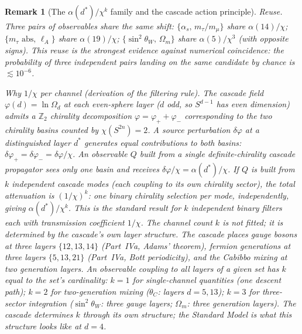 \documentclass[12pt,a4paper]{article}
\newtheorem*{remark}{Remark}
\begin{document}
\begin{remark}[The $\alpha(d^*)/\chi^k$ family and the cascade action principle]
\emph{Reuse.} Three pairs of observables share the same shift: $\{\alpha_s,\,m_\tau/m_\mu\}$ share $\alpha(14)/\chi$; $\{m_\tau\text{ abs},\,\ell_A\}$ share $\alpha(19)/\chi$; $\{\sin^2\theta_W,\,\Omega_m\}$ share $\alpha(5)/\chi^3$ (with opposite signs). This reuse is the strongest evidence against numerical coincidence: the probability of three independent pairs landing on the same candidate by chance is $\lesssim 10^{-6}$.

\emph{Why $1/\chi$ per channel (derivation of the filtering rule).} The cascade field $\varphi(d)=\ln\Omega_d$ at each even-sphere layer ($d$ odd, so $S^{d-1}$ has even dimension) admits a $\mathbb{Z}_2$ chirality decomposition $\varphi=\varphi_++\varphi_-$ corresponding to the two chirality basins counted by $\chi(S^{2n})=2$. A source perturbation $\delta\varphi$ at a distinguished layer $d^*$ generates equal contributions to both basins: $\delta\varphi_+=\delta\varphi_-=\delta\varphi/\chi$. An observable $Q$ built from a \emph{single} definite-chirality cascade propagator sees only one basin and receives $\delta\varphi/\chi=\alpha(d^*)/\chi$. If $Q$ is built from $k$ \emph{independent} cascade modes (each coupling to its own chirality sector), the total attenuation is $(1/\chi)^k$: one binary chirality selection per mode, independently, giving $\alpha(d^*)/\chi^k$. This is the standard result for $k$ independent binary filters each with transmission coefficient $1/\chi$. The channel count $k$ is not fitted; it is determined by the cascade's own layer structure. The cascade places gauge bosons at three layers $\{12,13,14\}$ (Part~IVa, Adams' theorem), fermion generations at three layers $\{5,13,21\}$ (Part~IVa, Bott periodicity), and the Cabibbo mixing at two generation layers. An observable coupling to all layers of a given set has $k$ equal to the set's cardinality: $k=1$ for single-channel quantities (one descent path); $k=2$ for two-generation mixing ($\theta_C$: layers $d=5,13$); $k=3$ for three-sector integration ($\sin^2\theta_W$: three gauge layers; $\Omega_m$: three generation layers). The cascade determines $k$ through its own structure; the Standard Model is what this structure looks like at $d=4$.


\end{remark}
\end{document}
